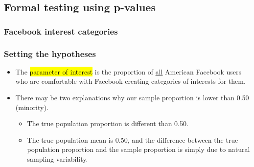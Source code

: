 
\subsection{Formal testing using p-values}


\begin{frame}
\frametitle{Facebook interest categories}
 
 
\vfill
 
 
\end{frame}
 

\begin{frame}
\frametitle{Setting the hypotheses}

\begin{itemize}

\item The \hl{parameter of interest} is the proportion of \underline{all} American Facebook users who are comfortable with Facebook creating categories of interests for them.

\pause

\item There may be two explanations why our sample proportion is lower than 0.50 (minority).
\begin{itemize}
\item The true population proportion is different than 0.50.
\item The true population mean is 0.50, and the difference between the true population proportion and the sample proportion is simply due to natural sampling variability.
\end{itemize}

 \end{itemize}

\end{frame}

